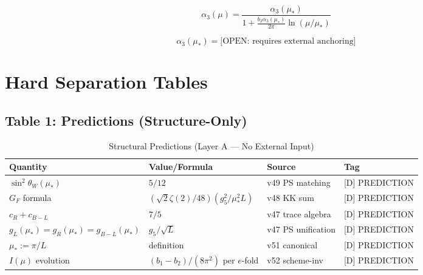 \documentclass[11pt,a4paper]{article}
\theoremstyle{definition}
\begin{document}
\begin{equation}
\label{eq:alpha_3_evolution}
\alpha_3(\mu) = \frac{\alpha_3(\mu_*)}{1 + \frac{b_3\alpha_3(\mu_*)}{2\pi}\ln(\mu/\mu_*)}
\end{equation}

\begin{equation}
\label{eq:alpha_3_open}
\alpha_3(\mu_*) = \text{[OPEN: requires external anchoring]}
\end{equation}

\section{Hard Separation Tables}
\label{sec:tables}

\subsection{Table 1: Predictions (Structure-Only)}
\label{subsec:table_predictions}

\begin{table}[h]
\centering
\caption{Structural Predictions (Layer A --- No External Input)}
\label{tab:predictions}
\begin{tabular}{@{}llll@{}}
\toprule
\textbf{Quantity} & \textbf{Value/Formula} & \textbf{Source} & \textbf{Tag} \\
\midrule
$\sin^2\theta_W(\mu_*)$ & $5/12$ & v49 PS matching & [D] PREDICTION \\
$G_F$ formula & $(\sqrt{2}\zeta(2)/48)(g_5^2/\mu_*^2 L)$ & v48 KK sum & [D] PREDICTION \\
$c_R + c_{B-L}$ & $7/5$ & v47 trace algebra & [D] PREDICTION \\
$g_L(\mu_*) = g_R(\mu_*) = g_{B-L}(\mu_*)$ & $g_5/\sqrt{L}$ & v47 PS unification & [D] PREDICTION \\
$\mu_* := \pi/L$ & definition & v51 canonical & [D] PREDICTION \\
$I(\mu)$ evolution & $(b_1 - b_2)/(8\pi^2)$ per $e$-fold & v52 scheme-inv & [D] PREDICTION \\
\bottomrule
\end{tabular}
\end{table}
\end{document}
